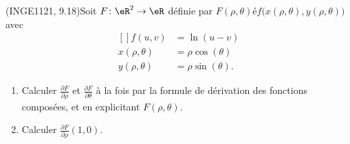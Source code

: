 
\begin{exercice}\label{exoFoncDeuxVar0024}

	(INGE1121, 9.18)Soit $F\colon \eR^2\to \eR$ définie par $F(\rho,\theta)éf\big( x(\rho,\theta),y(\rho,\theta) \big)$ avec
	\begin{equation}
		\begin{aligned}[]
			f(u,v)&=\ln(u-v)\\
			x(\rho,\theta)&=\rho\cos(\theta)\\
			y(\rho,\theta)&=\rho\sin(\theta).
		\end{aligned}
	\end{equation}
	\begin{enumerate}

		\item
			Calculer $\frac{ \partial F }{ \partial \rho }$ et $\frac{ \partial F }{ \partial \theta }$ à la fois par la formule de dérivation des fonctions composées, et en explicitant $F(\rho,\theta)$.
		\item
			Calculer $\frac{ \partial F }{ \partial \rho }(1,0)$.

	\end{enumerate}

\end{exercice}
